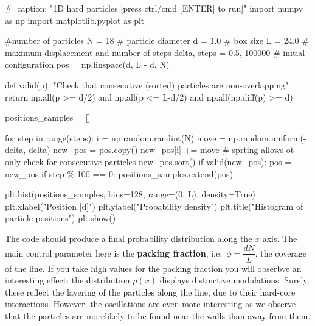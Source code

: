 \documentclass[
  letterpaper,
  enabledeprecatedfontcommands]{report}
\newenvironment{Shaded}{\begin{snugshade}}{\end{snugshade}}
\newcommand{\NormalTok}[1]{\textcolor[rgb]{0.00,0.23,0.31}{#1}}
\begin{document}
\begin{Shaded}
\begin{Highlighting}[]
\NormalTok{\#| caption: "1D hard particles [press ctrl/cmd [ENTER] to run]"}
\NormalTok{import numpy as np}
\NormalTok{import matplotlib.pyplot as plt}

\NormalTok{\#number of particles }
\NormalTok{N = 18}
\NormalTok{\# particle diameter}
\NormalTok{d = 1.0}
\NormalTok{\# box size}
\NormalTok{L = 24.0}
\NormalTok{\# maximum displacement and number of steps}
\NormalTok{delta, steps =  0.5, 100000}
\NormalTok{\# initial configuration }
\NormalTok{pos = np.linspace(d, L {-} d, N)}

\NormalTok{def valid(p):}
\NormalTok{    "Check that consecutive (sorted) particles are non{-}overlapping"}
\NormalTok{    return np.all(p \textgreater{}= d/2) and np.all(p \textless{}= L{-}d/2) and np.all(np.diff(p) \textgreater{}= d)}

\NormalTok{positions\_samples = []}

\NormalTok{for step in range(steps):}
\NormalTok{    i = np.random.randint(N)}
\NormalTok{    move = np.random.uniform({-}delta, delta)}
\NormalTok{    new\_pos = pos.copy()}
\NormalTok{    new\_pos[i] += move}
\NormalTok{    \# sprting allows ot only check for consecutive particles}
\NormalTok{    new\_pos.sort()}
\NormalTok{    if valid(new\_pos):}
\NormalTok{        pos = new\_pos}
\NormalTok{    if step \% 100 == 0:}
\NormalTok{        positions\_samples.extend(pos)}

\NormalTok{plt.hist(positions\_samples, bins=128, range=(0, L), density=True)}
\NormalTok{plt.xlabel("Position [d]")}
\NormalTok{plt.ylabel("Probability density")}
\NormalTok{plt.title("Histogram of particle positions")}
\NormalTok{plt.show()}
\end{Highlighting}
\end{Shaded}

The code should produce a final probability distribution along the \(x\)
axis. The main control parameter here is the \textbf{packing fraction},
i.e.~\(\phi = \dfrac{dN}{L}\), the coverage of the line. If you take
high values for the packing fraction you will obserbve an interesting
effect: the distribution \(\rho(x)\) displays distinctive modulations.
Surely, these reflect the layering of the particles along the line, due
to their hard-core interactions. However, the oscillations are even more
interesting as we observe that the particles are morelikely to be found
near the walls than away from them.
\end{document}
